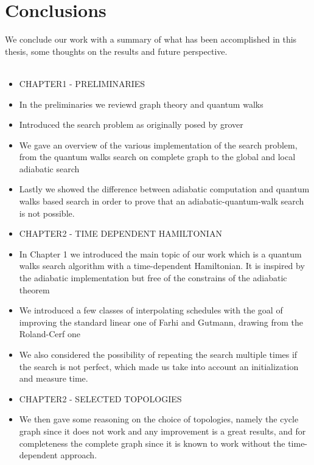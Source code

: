 \newpage
\chapter*{Conclusions}


We conclude our work with a summary of what has been accomplished in this thesis, some thoughts on the results and future perspective. \\ \\

\begin{itemize}
  \item CHAPTER1 - PRELIMINARIES
  \item In the preliminaries we reviewd graph theory and quantum walks
  \item Introduced the search problem as originally posed by grover
  \item We gave an overview of the various implementation of the search problem, from the quantum walks search on complete graph to the global and local adiabatic search
  \item Lastly we showed the difference between adiabatic computation and quantum walks based search in order to prove that an adiabatic-quantum-walk search is not possible.

  \item CHAPTER2 - TIME DEPENDENT HAMILTONIAN
  \item In Chapter 1 we introduced the main topic of our work which is a quantum walks search algorithm with a time-dependent Hamiltonian. It is inspired by the adiabatic implementation but free of the constrains of the adiabatic theorem
  \item We introduced a few classes of interpolating schedules with the goal of improving the standard linear one of Farhi and Gutmann, drawing from the Roland-Cerf one
  \item We also considered the possibility of repeating the search multiple times if the search is not perfect, which made us take into account an initialization and measure time.

  \item CHAPTER2 - SELECTED TOPOLOGIES
  \item We then gave some reasoning on the choice of topologies, namely the cycle graph since it does not work and any improvement is a great results, and for completeness the complete graph since it is known to work without the time-dependent approach.


\end{itemize}
